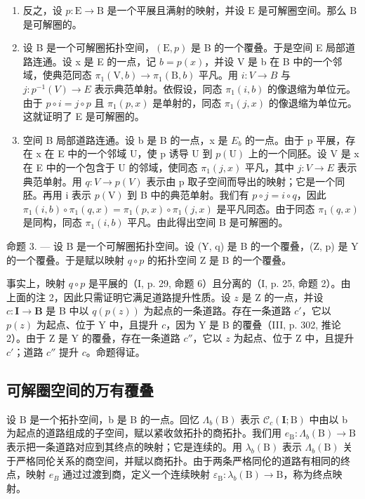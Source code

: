 \begin{enumerate}
\def\labelenumi{\alph{enumi})}
\setcounter{enumi}{1}
\item
  反之，设 \(p \colon \mathrm{E} \to \mathrm{B}\) 是一个平展且满射的映射，并设 \(\mathrm{E}\) 是可解圈空间。那么 \(\mathrm{B}\) 是可解圈的。
\item
  设 B 是一个可解圈拓扑空间，\((\mathrm{E}, p)\) 是 B 的一个覆叠。于是空间 E 局部道路连通。设 x 是 E 的一点，记 \(b = p(x)\)，并设 V 是 b 在 B 中的一个邻域，使典范同态 \(\pi_{1}(\mathrm{V}, b) \to \pi_{1}(\mathrm{B}, b)\) 平凡。用 \(i: V \to B\) 与 \(j: p^{-1}(V) \to E\) 表示典范单射。依假设，同态 \(\pi_{1}(i, b)\) 的像退缩为单位元。由于 \(p \circ i = j \circ p\) 且 \(\pi_{1}(p, x)\) 是单射的，同态 \(\pi_{1}(j, x)\) 的像退缩为单位元。这就证明了 E 是可解圈的。
\item
  空间 B 局部道路连通。设 b 是 B 的一点，x 是 \(E_{b}\) 的一点。由于 p 平展，存在 x 在 E 中的一个邻域 U，使 p 诱导 U 到 \(p(\mathrm{U})\) 上的一个同胚。设 V 是 x 在 E 中的一个包含于 U 的邻域，使同态 \(\pi_{1}(j,x)\) 平凡，其中 \(j:V\to E\) 表示典范单射。用 \(q:V\to p(V)\) 表示由 p 取子空间而导出的映射；它是一个同胚。再用 i 表示 \(p(\mathrm{V})\) 到 B 中的典范单射。我们有 \(p\circ j=i\circ q\)，因此 \(\pi_{1}(i,b)\circ\pi_{1}(q,x)=\pi_{1}(p,x)\circ\pi_{1}(j,x)\) 是平凡同态。由于同态 \(\pi_{1}(q,x)\) 是同构，同态 \(\pi_{1}(i,b)\) 平凡。由此得出空间 B 是可解圈的。
\end{enumerate}

命题 3. --- 设 B 是一个可解圈拓扑空间。设 (Y, q) 是 B 的一个覆叠，(Z, p) 是 Y 的一个覆叠。于是赋以映射 \(q \circ p\) 的拓扑空间 Z 是 B 的一个覆叠。

事实上，映射 \(q \circ p\) 是平展的（I, p. 29, 命题 6）且分离的（I, p. 25, 命题 2）。由上面的注 2，因此只需证明它满足道路提升性质。设 \(z\) 是 Z 的一点，并设 \(c \colon \mathbf{I} \to \mathbf{B}\) 是 B 中以 \(q(p(z))\) 为起点的一条道路。存在一条道路 \(c'\)，它以 \(p(z)\) 为起点、位于 Y 中，且提升 \(c\)，因为 Y 是 B 的覆叠（III, p. 302, 推论 2）。由于 Z 是 Y 的覆叠，存在一条道路 \(c''\)，它以 \(z\) 为起点、位于 Z 中，且提升 \(c'\)；道路 \(c''\) 提升 \(c\)。命题得证。

\subsection{可解圈空间的万有覆叠}

设 B 是一个拓扑空间，b 是 B 的一点。回忆 \(\Lambda_{b}(\mathrm{B})\) 表示 \(\mathcal{C}_{c}(\mathbf{I};\mathrm{B})\) 中由以 b 为起点的道路组成的子空间，赋以紧收敛拓扑的商拓扑。我们用 \(e_{\mathrm{B}}\colon\Lambda_{b}(\mathrm{B})\to\mathrm{B}\) 表示把一条道路对应到其终点的映射；它是连续的。用 \(\lambda_{b}(\mathrm{B})\) 表示 \(\Lambda_{b}(\mathrm{B})\) 关于严格同伦关系的商空间，并赋以商拓扑。由于两条严格同伦的道路有相同的终点，映射 \(e_{B}\) 通过过渡到商，定义一个连续映射 \(\varepsilon_{\mathrm{B}}\colon\lambda_{b}(\mathrm{B})\to\mathrm{B}\)，称为终点映射。

